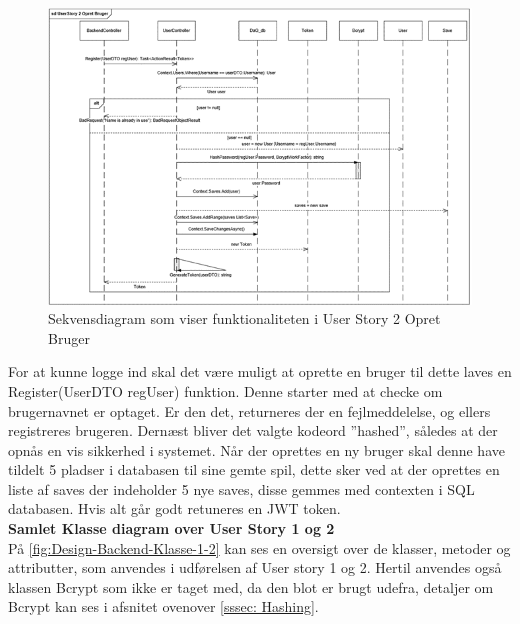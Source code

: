 \begin{figure}[H]
\centering
\includegraphics[width = \textwidth]{02-Body/Images/Backend_sekvens_2.PNG}
\caption{Sekvensdiagram som viser funktionaliteten i User Story 2 Opret Bruger}
\label{fig:Design-Backend-Sekvens-2}
\end{figure}

For at kunne logge ind skal det være muligt at oprette en bruger til dette laves en Register(UserDTO regUser) funktion. Denne starter med at checke om brugernavnet er optaget. Er den det, returneres der en fejlmeddelelse, og ellers registreres brugeren. Dernæst bliver det valgte kodeord ”hashed”, således at der opnås en vis sikkerhed i systemet. Når der oprettes en ny bruger skal denne have tildelt 5 pladser i databasen til sine gemte spil, dette sker ved at der oprettes en liste af saves der indeholder 5 nye saves, disse gemmes med contexten i SQL databasen. Hvis alt går godt retuneres en JWT token.\\

\textbf{Samlet Klasse diagram over User Story 1 og 2}\\

På \autoref{fig:Design-Backend-Klasse-1-2} kan ses en oversigt over de klasser, metoder og attributter, som anvendes i udførelsen af User story 1 og 2. Hertil anvendes også klassen Bcrypt som ikke er taget med, da den blot er brugt udefra, detaljer om Bcrypt kan ses i afsnitet ovenover \autoref{sssec: Hashing}.\\

